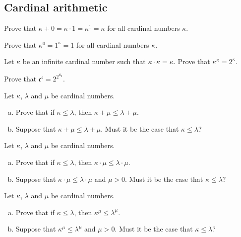 \subsection*{Cardinal arithmetic}

\begin{chapex}
Prove that $\kappa + 0 = \kappa \cdot 1 = \kappa^1 = \kappa$ for all cardinal numbers $\kappa$.
\end{chapex}

\begin{chapex}
Prove that $\kappa^0 = 1^{\kappa} = 1$ for all cardinal numbers $\kappa$.
\end{chapex}

\begin{chapex}
Let $\kappa$ be an infinite cardinal number such that $\kappa \cdot \kappa = \kappa$. Prove that $\kappa^{\kappa} = 2^{\kappa}$.
\end{chapex}

\begin{chapex}
Prove that $\mathfrak{c}^{\mathfrak{c}} = 2^{2^{\aleph_0}}$.
\end{chapex}

\begin{chapex}
Let $\kappa$, $\lambda$ and $\mu$ be cardinal numbers.
\begin{enumerate}[(a)]
\item Prove that if $\kappa \le \lambda$, then $\kappa + \mu \le \lambda + \mu$.
\item Suppose that $\kappa + \mu \le \lambda + \mu$. Must it be the case that $\kappa \le \lambda$?
\end{enumerate}
\end{chapex}

\begin{chapex}
Let $\kappa$, $\lambda$ and $\mu$ be cardinal numbers.
\begin{enumerate}[(a)]
\item Prove that if $\kappa \le \lambda$, then $\kappa \cdot \mu \le \lambda \cdot \mu$.
\item Suppose that $\kappa \cdot \mu \le \lambda \cdot \mu$ and $\mu > 0$. Must it be the case that $\kappa \le \lambda$?
\end{enumerate}
\end{chapex}

\begin{chapex}
Let $\kappa$, $\lambda$ and $\mu$ be cardinal numbers.
\begin{enumerate}[(a)]
\item Prove that if $\kappa \le \lambda$, then $\kappa^{\mu} \le \lambda^{\mu}$.
\item Suppose that $\kappa^{\mu} \le \lambda^{\mu}$ and $\mu > 0$. Must it be the case that $\kappa \le \lambda$?
\end{enumerate}
\end{chapex}


